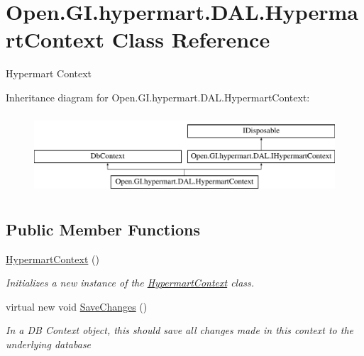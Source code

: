 \hypertarget{class_open_1_1_g_i_1_1hypermart_1_1_d_a_l_1_1_hypermart_context}{}\section{Open.\+G\+I.\+hypermart.\+D\+A\+L.\+Hypermart\+Context Class Reference}
\label{class_open_1_1_g_i_1_1hypermart_1_1_d_a_l_1_1_hypermart_context}


Hypermart Context  


Inheritance diagram for Open.\+G\+I.\+hypermart.\+D\+A\+L.\+Hypermart\+Context\+:\begin{figure}[H]
\begin{center}
\leavevmode
\includegraphics[height=3.000000cm]{class_open_1_1_g_i_1_1hypermart_1_1_d_a_l_1_1_hypermart_context}
\end{center}
\end{figure}
\subsection*{Public Member Functions}
\begin{DoxyCompactItemize}
\item 
\hyperlink{class_open_1_1_g_i_1_1hypermart_1_1_d_a_l_1_1_hypermart_context_a3bcbe3fbf08e41a8b384326b606a7327}{Hypermart\+Context} ()
\begin{DoxyCompactList}\small\item\em Initializes a new instance of the \hyperlink{class_open_1_1_g_i_1_1hypermart_1_1_d_a_l_1_1_hypermart_context}{Hypermart\+Context} class. \end{DoxyCompactList}\item 
virtual new void \hyperlink{class_open_1_1_g_i_1_1hypermart_1_1_d_a_l_1_1_hypermart_context_a53edb75fbc2507fc97eaf26e36d92f42}{Save\+Changes} ()
\begin{DoxyCompactList}\small\item\em In a DB Context object, this should save all changes made in this context to the underlying database \end{DoxyCompactList}\end{DoxyCompactItemize}
